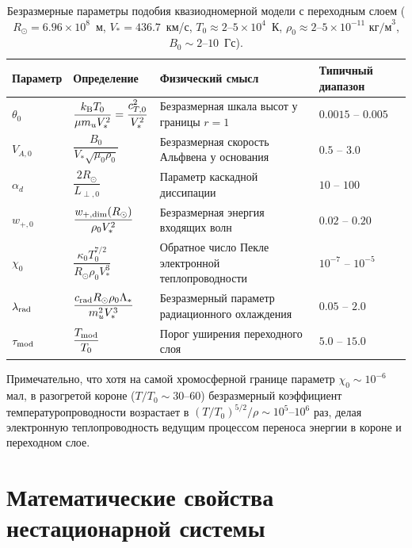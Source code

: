 \documentclass[11pt,a4paper]{article}
\begin{document}
\begin{table}[ht!]
\centering
\caption{Безразмерные параметры подобия квазиодномерной модели с переходным слоем ($R_\odot = 6.96\times 10^8$~м, $V_* = 436.7$~км/с, $T_0 \approx 2\text{--}5\times 10^4$~К, $\rho_0 \approx 2\text{--}5\times 10^{-11}\text{ кг/м}^3$, $B_0 \sim 2\text{--}10$~Гс).}
\vspace{2mm}
\begin{tabular}{@{}llll@{}}
\toprule
\textbf{Параметр} & \textbf{Определение} & \textbf{Физический смысл} & \textbf{Типичный диапазон} \\
\midrule
$\theta_0$ & $\dfrac{k_{\rm B}T_0}{\mu m_u V_*^2} = \dfrac{c_{T,0}^2}{V_*^2}$ & Безразмерная шкала высот у границы $r=1$ & $0.0015 \text{ -- } 0.005$ \\[7pt]
$V_{A,0}$ & $\dfrac{B_0}{V_*\sqrt{\mu_0\rho_0}}$ & Безразмерная скорость Альфвена у основания & $0.5 \text{ -- } 3.0$ \\[7pt]
$\alpha_d$ & $\dfrac{2 R_\odot}{L_{\perp,0}}$ & Параметр каскадной диссипации & $10 \text{ -- } 100$ \\[7pt]
$w_{+,0}$ & $\dfrac{w_{+,{\rm dim}}(R_\odot)}{\rho_0 V_*^2}$ & Безразмерная энергия входящих волн & $0.02 \text{ -- } 0.20$ \\[7pt]
$\chi_0$ & $\dfrac{\kappa_0 T_0^{7/2}}{R_\odot\rho_0 V_*^3}$ & Обратное число Пекле электронной теплопроводности & $10^{-7} \text{ -- } 10^{-5}$ \\[7pt]
$\lambda_{\rm rad}$ & $\dfrac{c_{\rm rad} R_\odot \rho_0 \Lambda_*}{m_u^2 V_*^3}$ & Безразмерный параметр радиационного охлаждения & $0.05 \text{ -- } 2.0$ \\[7pt]
$\tau_{\rm mod}$ & $\dfrac{T_{\rm mod}}{T_0}$ & Порог уширения переходного слоя & $5.0 \text{ -- } 15.0$ \\
\bottomrule
\end{tabular}
\label{tab:params}
\end{table}

Примечательно, что хотя на самой хромосферной границе параметр $\chi_0 \sim 10^{-6}$ мал, в разогретой короне ($T/T_0 \sim 30\text{--}60$) безразмерный коэффициент температуропроводности возрастает в $(T/T_0)^{5/2} / \rho \sim 10^5\text{--}10^6$ раз, делая электронную теплопроводность ведущим процессом переноса энергии в короне и переходном слое.

\section{Математические свойства нестационарной системы}
\end{document}
